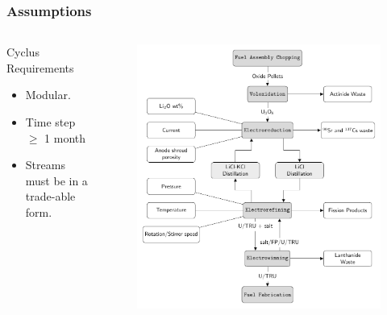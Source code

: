 \begin{frame}
\frametitle{Assumptions}
\begin{columns}
	\begin{column}{.45\textwidth}
		\begin{block}{Cyclus Requirements} 
			\begin{itemize}
				\item Modular.
				\item Time step $\geq$ 1 month
				\item Streams must be in a
				trade-able form.
			\end{itemize}
		\end{block}
	\end{column}
	\begin{column}{.55\textwidth}
		\begin{figure}
			\centering
			\includegraphics[width=0.9\linewidth]{flowchart}
			\label{fig:cyclus}
		\end{figure}
	\end{column}
\end{columns} 
\end{frame}

